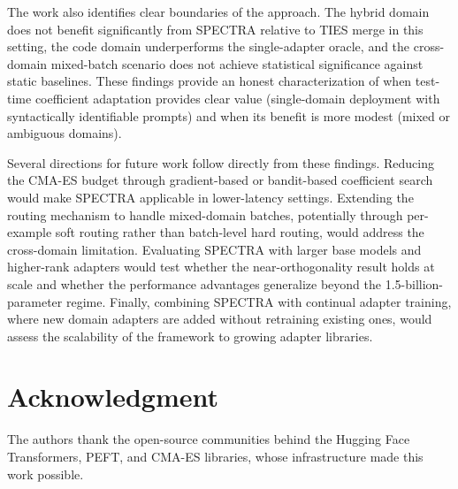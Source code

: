 \documentclass[preprint,12pt]{elsarticle}
\begin{document}
The work also identifies clear boundaries of the approach. The hybrid domain
does not benefit significantly from SPECTRA relative to TIES merge in this
setting, the code domain underperforms the single-adapter oracle, and the
cross-domain mixed-batch scenario does not achieve statistical significance
against static baselines. These findings provide an honest characterization
of when test-time coefficient adaptation provides clear value (single-domain
deployment with syntactically identifiable prompts) and when its benefit is
more modest (mixed or ambiguous domains).

Several directions for future work follow directly from these findings. Reducing
the CMA-ES budget through gradient-based or bandit-based coefficient search
would make SPECTRA applicable in lower-latency settings. Extending the routing
mechanism to handle mixed-domain batches, potentially through per-example soft
routing rather than batch-level hard routing, would address the cross-domain
limitation. Evaluating SPECTRA with larger base models and higher-rank adapters
would test whether the near-orthogonality result holds at scale and whether
the performance advantages generalize beyond the 1.5-billion-parameter regime.
Finally, combining SPECTRA with continual adapter training, where new domain
adapters are added without retraining existing ones, would assess the
scalability of the framework to growing adapter libraries.

\section*{Acknowledgment}
The authors thank the open-source communities behind the Hugging Face
Transformers, PEFT, and CMA-ES libraries, whose infrastructure made this
work possible.

\end{document}
